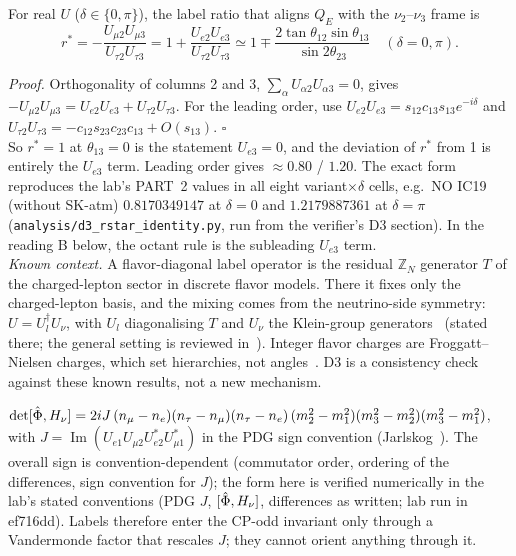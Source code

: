 \begin{proposition}\label{prop:rstar}
For real $U$ ($\delta\in\{0,\pi\}$), the label ratio that aligns $Q_E$ with the $\nu_2$--$\nu_3$
frame is
\[
  r^*=-\frac{U_{\mu2}U_{\mu3}}{U_{\tau2}U_{\tau3}}
     =1+\frac{U_{e2}U_{e3}}{U_{\tau2}U_{\tau3}}
     \simeq1\mp\frac{2\tan\theta_{12}\sin\theta_{13}}{\sin2\theta_{23}}
     \quad(\delta=0,\pi).
\]
\end{proposition}
\noindent\emph{Proof.} Orthogonality of columns 2 and 3,
$\sum_\alpha U_{\alpha2}U_{\alpha3}=0$, gives $-U_{\mu2}U_{\mu3}=U_{e2}U_{e3}+U_{\tau2}U_{\tau3}$.
For the leading order, use $U_{e2}U_{e3}=s_{12}c_{13}s_{13}e^{-i\delta}$ and
$U_{\tau2}U_{\tau3}=-c_{12}s_{23}c_{23}c_{13}+O(s_{13})$. $\square$\\
So $r^*=1$ at $\theta_{13}=0$ is the statement $U_{e3}=0$, and the deviation of $r^*$ from 1 is
entirely the $U_{e3}$ term. Leading order gives $\approx0.80$ / $1.20$. The exact form reproduces the
lab's PART~2 values in all eight variant$\times\delta$ cells, e.g.\ NO IC19 (without SK-atm)
$0.8170349147$ at $\delta=0$ and $1.2179887361$ at $\delta=\pi$
(\texttt{analysis/d3\_rstar\_identity.py}, run from the verifier's D3 section). In the
reading B below, the octant rule is the subleading $U_{e3}$ term.\\
\emph{Known context.} A flavor-diagonal label operator is the residual $\mathbb Z_N$ generator $T$ of
the charged-lepton sector in discrete flavor models. There it fixes only the charged-lepton basis,
and the mixing comes from the neutrino-side symmetry: $U=U_l^\dagger U_\nu$, with $U_l$
diagonalising $T$ and $U_\nu$ the Klein-group generators~\cite{residual2014} (stated there; the
general setting is reviewed in~\cite{kingluhn2013,feruglioromanino2021}). Integer flavor charges are Froggatt--Nielsen charges, which set
hierarchies, not angles~\cite{froggattnielsen1979}. D3 is a consistency check against these known
results, not a new mechanism.\\
\begin{proposition}\label{prop:jarlskog}
$\det[\hat\Phi,H_\nu]=2iJ\,(n_\mu-n_e)(n_\tau-n_\mu)(n_\tau-n_e)\,
(m_2^2-m_1^2)(m_3^2-m_2^2)(m_3^2-m_1^2)$, with
$J=\operatorname{Im}(U_{e1}U_{\mu2}U_{e2}^*U_{\mu1}^*)$ in the PDG sign convention
(Jarlskog~\cite{jarlskog1985}). The overall sign is convention-dependent (commutator order,
ordering of the differences, sign convention for $J$); the form here is verified numerically in the
lab's stated conventions (PDG $J$, $[\hat\Phi,H_\nu]$, differences as written; lab run in ef716dd). Labels therefore enter the CP-odd invariant only through a
Vandermonde factor that rescales $J$; they cannot orient anything through it.
\end{proposition}
